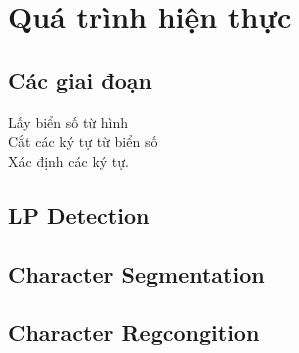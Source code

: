 \chapter{Quá trình hiện thực}
\section{Các giai đoạn}
Lấy biển số từ hình\\
Cắt các ký tự từ biển số\\
Xác định các ký tự.
\section{LP Detection}
\section{Character Segmentation}
\section{Character Regcongition}